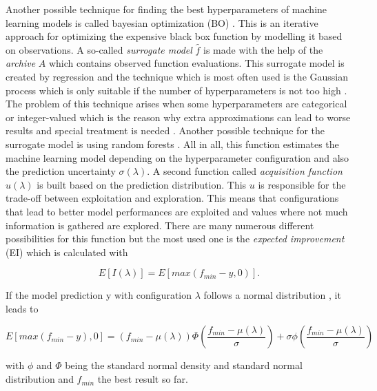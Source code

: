 Another possible technique for finding the best hyperparameters of machine learning models is called bayesian optimization (BO) \cite{snoek2012practical}. This is an iterative approach for optimizing the expensive black box function by modelling it based on observations. A so-called \textit{surrogate model} $ \hat{f} $ is made with the help of the \textit{archive} $ A $ which contains observed function evaluations. This surrogate model is created by regression and the technique which is most often used is the Gaussian process \cite{bischl2021hyperparameter} which is only suitable if the number of hyperparameters is not too high \cite{andonie2019hyperparameter}. The problem of this technique arises when some hyperparameters are categorical or integer-valued which is the reason why extra approximations can lead to worse results and special treatment is needed \cite{garrido2020dealing}. Another possible technique for the surrogate model is using random forests \cite{hutter2011sequential}. All in all, this function estimates the machine learning model depending on the hyperparameter configuration and also the prediction uncertainty $ \sigma(\lambda) $. A second function called \textit{acquisition function} $ u(\lambda)$ is built based on the prediction distribution. This $ u $ is responsible for the trade-off between exploitation and exploration. This means that configurations that lead to better model performances are exploited and values where not much information is gathered are explored. There are many numerous different possibilities for this function  \cite{wilson2018maximizing} but the most used one is the \textit{expected improvement} (EI) which is calculated with

\begin{equation}
	E[I(\lambda)] = E\left[max\left(f_{min}-y, 0\right)\right].
\end{equation}

If the model prediction y with configuration $ \lambda $ follows a normal distribution \cite{feurer2019hyperparameter}, it leads to 

\begin{equation}
	E[max\left(f_{min}-y\right), 0] = \left(f_{min}-\mu(\lambda)\right) \Phi\left(\frac{f_{min}-\mu(\lambda)}{\sigma}\right) + \sigma \phi \left(\frac{f_{min}-\mu(\lambda)}{\sigma}\right)
\end{equation}

with $ \phi $ and $ \Phi $ being the standard normal density and standard normal distribution and $ f_{min} $ the best result so far. 


